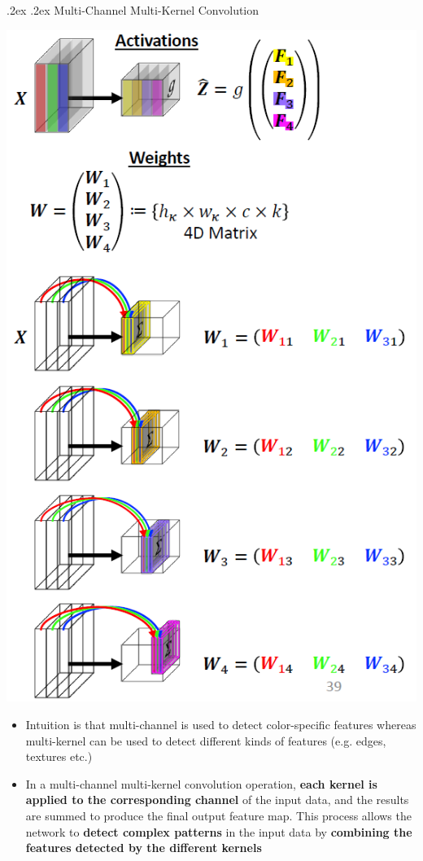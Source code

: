 \documentclass[landscape,a4paper]{article}
\makeatletter
\renewcommand{\subsection}{\@startsection{subsection}{1}{0mm}%
	{.2ex}%
	{.2ex}%
	{\sffamily\bfseries}}
\makeatother
\begin{document}
\begin{multicols*}{4}
	\subsection{Multi-Channel Multi-Kernel Convolution}
	\begin{minipage}{0.3\columnwidth}
		\begin{center}
			\includegraphics[width=1\columnwidth]{mcmk-conv}
		\end{center}
	\end{minipage}
	\begin{minipage}{0.6\columnwidth}
		\begin{itemize}
			\item Intuition is that multi-channel is used to detect color-specific features whereas multi-kernel can be used to detect different kinds of features (e.g. edges, textures etc.)
			\item In a multi-channel multi-kernel convolution operation, \textbf{each kernel is applied to the corresponding channel} of the input data, and the results are summed to produce the final output feature map. This process allows the network to \textbf{detect complex patterns} in the input data by \textbf{combining the features detected by the different kernels}
		\end{itemize}
	\end{minipage}

\end{multicols*}
\end{document}
